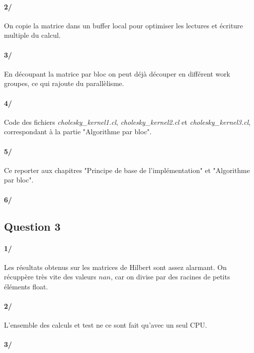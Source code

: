 \documentclass[paper=a4, fontsize=11pt]{scrartcl} %
\numberwithin{equation}{section} %
\numberwithin{figure}{section} %
\numberwithin{table}{section} %
\begin{document}
\paragraph{2/} On copie la matrice dans un buffer local pour optimiser les lectures et écriture multiple du calcul.

\paragraph{3/} En découpant la matrice par bloc on peut déjà découper en différent work groupes, ce qui rajoute du parallèlisme.

\paragraph{4/} Code des fichiers \textit{cholesky\_kernel1.cl}, \textit{cholesky\_kernel2.cl} et \textit{cholesky\_kernel3.cl}, correspondant à la partie "Algorithme par bloc".

\paragraph{5/} Ce reporter aux chapitres "Principe de base de l'implémentation" et "Algorithme par bloc".

\paragraph{6/} 


\subsection{Question 3}

\paragraph{1/} Les résultats obtenus sur les matrices de Hilbert sont assez alarmant. On récuppère très vite des valeurs $nan$, car on divise par des racines de petits éléments float.

\paragraph{2/} L'ensemble des calculs et test ne ce sont fait qu'avec un seul CPU.

\paragraph{3/} 
\end{document}
